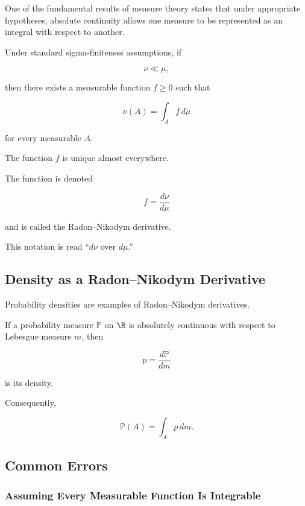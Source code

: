 One of the fundamental results of measure theory states that under
appropriate hypotheses, absolute continuity allows one measure to be
represented as an integral with respect to another.

\begin{theorem}
Under standard sigma-finiteness assumptions, if

\[
\nu\ll\mu,
\]

then there exists a measurable function \(f\geq0\) such that

\[
\boxed{
\nu(A)
=
\int_Af\,d\mu
}
\]

for every measurable \(A\).

The function \(f\) is unique almost everywhere.
\end{theorem}

The function is denoted

\[
\boxed{
f=\frac{d\nu}{d\mu}
}
\]

and is called the Radon--Nikodym derivative.

This notation is read ``\(d\nu\) over \(d\mu\).''

\subsection{Density as a Radon--Nikodym Derivative}
\label{subsec:density-radon-nikodym}

Probability densities are examples of Radon--Nikodym derivatives.

If a probability measure \(\mathbb{P}\) on \(\R\) is absolutely continuous
with respect to Lebesgue measure \(m\), then

\[
\boxed{
p
=
\frac{d\mathbb{P}}{dm}
}
\]

is its density.

Consequently,

\[
\boxed{
\mathbb{P}(A)
=
\int_Ap\,dm.
}
\]

\subsection{Common Errors}
\label{subsec:lebesgue-integration-common-errors}

\subsubsection{Assuming Every Measurable Function Is Integrable}

